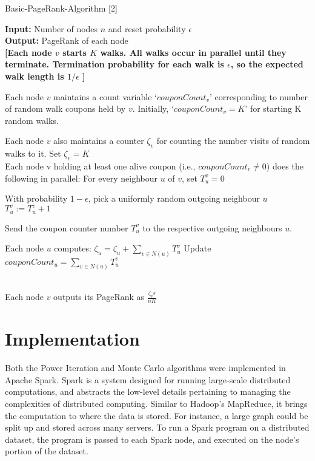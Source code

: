 \documentclass[letterpaper, 10 pt, conference]{ieeeconf}  %
\begin{document}
\begin{algorithm}

\caption{Basic-PageRank-Algorithm [2]}\label{euclid}
\textbf{Input:} Number of nodes $n$ and reset probability $\epsilon$ \\
\textbf{Output:} PageRank of each node \\
\textbf{[Each node $v$ starts $K$ walks. All walks occur in parallel until they terminate. Termination probability for each walk is $\epsilon$, so the expected walk length is $1/\epsilon$ ]}

\begin{algorithmic}[1]
\State Each node $v$ maintains a count variable `$couponCount_v$' corresponding to number of random walk coupons held by $v$. Initially, `$couponCount_v = K$' for starting K random walks.

\State Each node $v$ also maintains a counter $\zeta_v$ for counting the number visits of random walks to it. Set $\zeta_v = K$ \\

  \State Each node v holding at least one alive coupon (i.e., $couponCount_v \neq 0$) does the following in parallel:
  \State For every neighbour $u$ of $v$, set $T_u^v = 0$
  
    \State With probability $1-\epsilon$, pick a uniformly random outgoing neighbour $u$
    \State $T_u^v := T_u^v + 1$
  \EndFor

\State Send the coupon counter number $T_u^v$ to the respective outgoing neighbours $u$.

\State Each node $u$ computes: $\zeta_u = \zeta_u + \sum_{v\in N(u)} {T_u^v}$
\State Update $couponCount_u = \sum_{v\in N(u)} {T_u^v}$

\EndFor \\
\State Each node $v$ outputs its PageRank as $\frac{\zeta_v\epsilon}{n K}$

\end{algorithmic}
\end{algorithm}

\section{Implementation}
Both the Power Iteration and Monte Carlo algorithms were implemented in Apache Spark. Spark is a system designed for running large-scale distributed computations, and abstracts the low-level details pertaining to managing the complexities of distributed computing. Similar to Hadoop's MapReduce, it brings the computation to where the data is stored. For instance, a large graph could be split up and stored across many servers. To run a Spark program on a distributed dataset, the program is passed to each Spark node, and executed on the node’s portion of the dataset.
\end{document}
